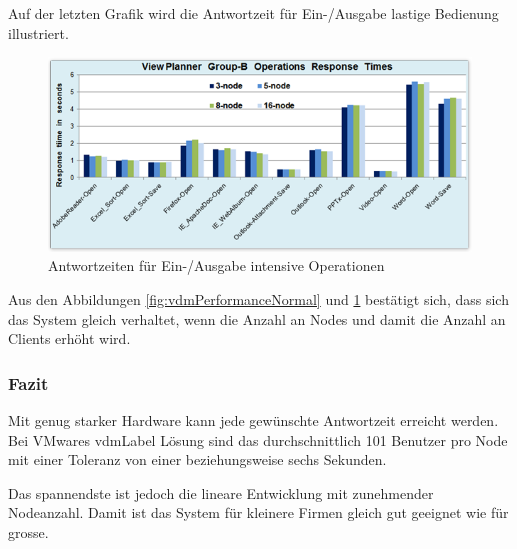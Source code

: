 Auf der letzten Grafik wird die Antwortzeit für Ein-/Ausgabe lastige Bedienung illustriert.
\begin{figure}[H]
	\includegraphics[width=\textwidth]{images/vmware-vdm-performance-io}
	\caption{Antwortzeiten für Ein-/Ausgabe intensive Operationen}
	\label{fig:vdmPerformanceIo}
\end{figure}

Aus den Abbildungen \ref{fig:vdmPerformanceNormal} und \ref{fig:vdmPerformanceIo} bestätigt sich, dass sich das System gleich verhaltet, wenn die Anzahl an Nodes und damit die Anzahl an Clients erhöht wird.

\subsubsection{Fazit}
Mit genug starker Hardware kann jede gewünschte Antwortzeit erreicht werden. Bei VMwares \Gls{vdmLabel} Lösung sind das durchschnittlich 101 Benutzer pro Node mit einer Toleranz von einer beziehungsweise sechs Sekunden.

Das spannendste ist jedoch die lineare Entwicklung mit zunehmender Nodeanzahl. Damit ist das System für kleinere Firmen gleich gut geeignet wie für grosse.





